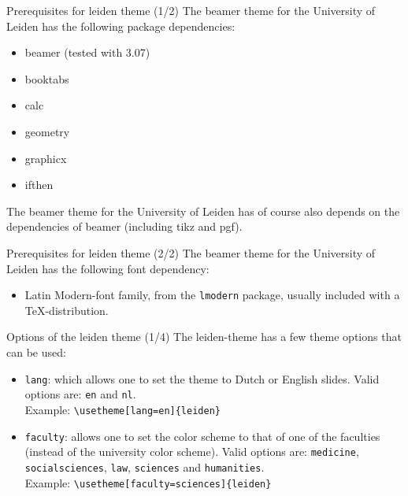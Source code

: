 \begin{frame}[fragile]{Prerequisites for leiden theme (1/2)}
The beamer theme for the University of Leiden has the following
package dependencies:
\begin{itemize}
\item	beamer (tested with 3.07)
\item   booktabs
\item	calc
\item	geometry
\item	graphicx
\item	ifthen
\end{itemize}
\vspace{\baselineskip}

The beamer theme for the University of Leiden has of course also
depends on the dependencies of beamer (including tikz and pgf).
\end{frame}

\begin{frame}[fragile]{Prerequisites for leiden theme (2/2)}
\small
The beamer theme for the University of Leiden has the following
font dependency:
\begin{itemize}
\item	Latin Modern-font family, from the \texttt{lmodern}
		package, usually included with a \TeX-distribution.
\end{itemize}
\end{frame}

\begin{frame}[fragile]{Options of the leiden theme (1/4)}
The leiden-theme has a few theme options that can be used:

\begin{itemize}
\item	\alert{\texttt{lang}}: which allows one to set the theme
		to Dutch or English slides.
		Valid options are: \verb|en| and \verb|nl|.\\
\vspace{0.1\baselineskip}
		Example: \verb|\usetheme[lang=en]{leiden}|
\vspace{0.5\baselineskip}
\item	\alert{\texttt{faculty}}: allows one to set the color
		scheme to that of one of the faculties (instead of the
		university color scheme).
		Valid options are: \verb|medicine|, \verb|socialsciences|,
		\verb|law|, \verb|sciences| and \verb|humanities|.\\
\vspace{0.1\baselineskip}
		Example: \verb|\usetheme[faculty=sciences]{leiden}|
\end{itemize}
\end{frame}


